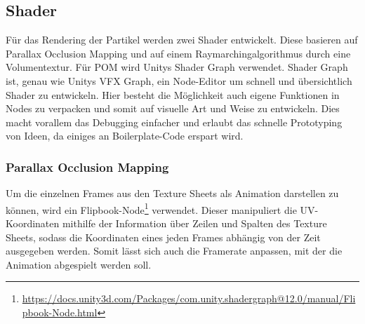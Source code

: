 



\subsection{Shader}
Für das Rendering der Partikel werden zwei Shader entwickelt. Diese basieren auf Parallax Occlusion Mapping und auf einem Raymarchingalgorithmus
durch eine Volumentextur. Für POM wird Unitys Shader Graph verwendet. Shader Graph ist, genau wie Unitys VFX Graph, ein Node-Editor um
schnell und übersichtlich Shader zu entwickeln. Hier besteht die Möglichkeit auch eigene Funktionen in Nodes
zu verpacken und somit auf visuelle Art und Weise zu entwickeln. Dies macht vorallem das Debugging einfacher und erlaubt das schnelle Prototyping von Ideen,
da einiges an Boilerplate-Code erspart wird.


\subsubsection{Parallax Occlusion Mapping}

Um die einzelnen Frames aus den Texture Sheets als Animation darstellen zu können, wird ein Flipbook-Node\footnote{\url{https://docs.unity3d.com/Packages/com.unity.shadergraph@12.0/manual/Flipbook-Node.html}}
verwendet. Dieser manipuliert die UV-Koordinaten mithilfe der Information über Zeilen und Spalten des Texture Sheets,
sodass die Koordinaten eines jeden Frames abhängig von der Zeit ausgegeben werden.
Somit lässt sich auch die Framerate anpassen, mit der die Animation abgespielt werden soll.

